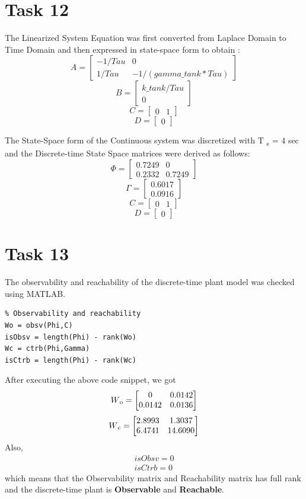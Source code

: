 \documentclass[a4paper,12pt,oneside,onecolumn]{article} %
\begin{document}
\section*{Task 12}

The Linearized System Equation was first converted from Laplace Domain to Time Domain and then expressed in state-space form to obtain :
\[
A = 
\begin{bmatrix}
  -1/Tau & 0 \\
  1/Tau & -1/(gamma \_ tank*Tau)
\end{bmatrix}
\]
\[
B = 
\begin{bmatrix}
  k \_ tank/Tau  \\
0
\end{bmatrix}
\]
\[
C = 
\begin{bmatrix}
  0 & 1
\end{bmatrix}
\]
\[
D = 
\begin{bmatrix}
  0
\end{bmatrix}
\]

The State-Space form of the Continuous system was discretized with T \textsubscript{s} = 4 sec and the Discrete-time State Space matrices were derived as follows:
\[
\Phi = 
\begin{bmatrix}
  0.7249 & 0 \\
  0.2332 & 0.7249
\end{bmatrix}
\]
\[
\Gamma = 
\begin{bmatrix}
  0.6017  \\
  0.0916
\end{bmatrix}
\]
\[
C = 
\begin{bmatrix}
  0 & 1
\end{bmatrix}
\]
\[
D = 
\begin{bmatrix}
  0
\end{bmatrix}
\]

\section*{Task 13}

The observability and reachability of the discrete-time plant model was checked using MATLAB. 
\begin{lstlisting}
% Observability and reachability
Wo = obsv(Phi,C)
isObsv = length(Phi) - rank(Wo)
Wc = ctrb(Phi,Gamma)
isCtrb = length(Phi) - rank(Wc)
\end{lstlisting}

After executing the above code snippet, we got
\[
W\textsubscript{o} = 
\begin{bmatrix}
  0 & 0.0142 \\
  0.0142 & 0.0136
\end{bmatrix}
\]
\[
W\textsubscript{c} =
\begin{bmatrix}
  2.8993 & 1.3037 \\
 6.4741 & 14.6090
\end{bmatrix}
\]
Also,
\begin{align*}
isObsv = 0 \\
isCtrb = 0
 \end{align*}
which means that the Observability matrix and Reachability matrix has full rank and the discrete-time plant is \textbf {Observable} and \textbf {Reachable}.
\end{document}
